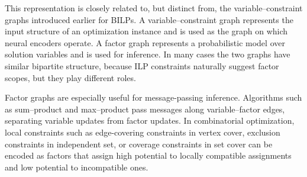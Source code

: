 This representation is closely related to, but distinct from, the variable--constraint graphs introduced earlier for BILPs. A variable--constraint graph represents the input structure of an optimization instance and is used as the graph on which neural encoders operate. A factor graph represents a probabilistic model over solution variables and is used for inference. In many cases the two graphs have similar bipartite structure, because ILP constraints naturally suggest factor scopes, but they play different roles.

Factor graphs are especially useful for message-passing inference. Algorithms such as sum--product and max--product pass messages along variable--factor edges, separating variable updates from factor updates. In combinatorial optimization, local constraints such as edge-covering constraints in vertex cover, exclusion constraints in independent set, or coverage constraints in set cover can be encoded as factors that assign high potential to locally compatible assignments and low potential to incompatible ones.

